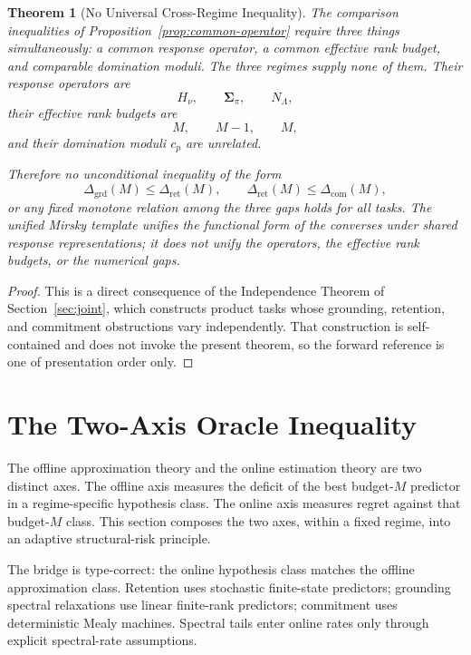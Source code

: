 \documentclass[12pt]{article}
\newtheorem{theorem}{Theorem}[section]
\theoremstyle{definition}
\begin{document}
\begin{theorem}[No Universal Cross-Regime Inequality]
\label{thm:schatten-nogo}
The comparison inequalities of Proposition~\ref{prop:common-operator} require
three things simultaneously: a common response operator, a common effective
rank budget, and comparable domination moduli.  The three regimes supply none
of them.  Their response operators are
\[
H_\nu,
\qquad
\bm{\Sigma}_\pi,
\qquad
N_\Lambda,
\]
their effective rank budgets are
\[
M,
\qquad
M-1,
\qquad
M,
\]
and their domination moduli $c_p$ are unrelated.

Therefore no unconditional inequality of the form
\[
\Delta_{\mathrm{grd}}(M)\le \Delta_{\mathrm{ret}}(M),
\qquad
\Delta_{\mathrm{ret}}(M)\le \Delta_{\mathrm{com}}(M),
\]
or any fixed monotone relation among the three gaps holds for all tasks.  The
unified Mirsky template unifies the functional \emph{form} of the converses
under shared response representations; it does not unify the operators, the
effective rank budgets, or the numerical gaps.
\end{theorem}

\begin{proof}
This is a direct consequence of the Independence Theorem of
Section~\ref{sec:joint}, which constructs product tasks whose grounding,
retention, and commitment obstructions vary independently.  That construction
is self-contained and does not invoke the present theorem, so the forward
reference is one of presentation order only.
\end{proof}

\section{The Two-Axis Oracle Inequality}
\label{sec:oracle}

The offline approximation theory and the online estimation theory are two
distinct axes.  The offline axis measures the deficit of the best budget-$M$
predictor in a regime-specific hypothesis class.  The online axis measures
regret against that budget-$M$ class.  This section composes the two axes,
within a fixed regime, into an adaptive structural-risk principle.

The bridge is type-correct: the online hypothesis class matches the offline
approximation class.  Retention uses stochastic finite-state predictors;
grounding spectral relaxations use linear finite-rank predictors; commitment
uses deterministic Mealy machines.  Spectral tails enter online rates only
through explicit spectral-rate assumptions.
\end{document}
